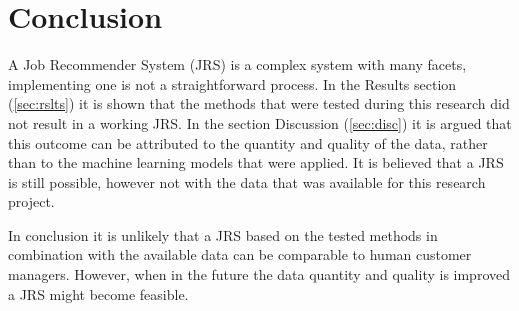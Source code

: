 \section{Conclusion}
\label{sec:concl}

A Job Recommender System (JRS) is a complex system with many facets, implementing one is not a straightforward process.
In the Results section (\ref{sec:rslts}) it is shown that the methods that were tested during this research did not result in a working JRS.
In the section Discussion (\ref{sec:disc}) it is argued that this outcome can be attributed to the quantity and quality of the data, rather than to the machine learning models that were applied.
It is believed that a JRS is still possible, however not with the data that was available for this research project.

In conclusion it is unlikely that a JRS based on the tested methods in combination with the available data can be comparable to human customer managers.
However, when in the future the data quantity and quality is improved a JRS might become feasible.